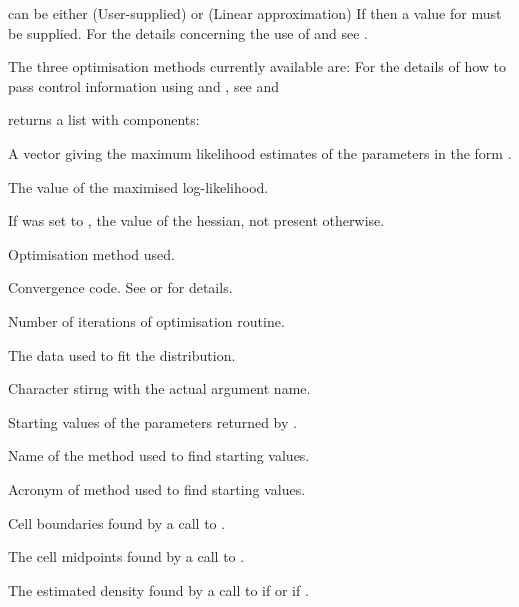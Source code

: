\documentclass{book}
\begin{document}
\begin{Details}\relax
{} can be either (User-supplied) or
 (Linear approximation)
If  then a value for  must be
supplied. For the details concerning the use of 
and  see .

The three optimisation methods currently available are:
For the details of how to pass control information using
 and , see  and
\end{Details}
\begin{Value}
 returns a list with components:
\begin{ldescription}
\item[\code{param}] A vector giving the maximum likelihood estimates of the
parameters in the form .
\item[\code{maxLik}] The value of the maximised log-likelihood.
\item[\code{hessian}] If  was set to , the value of
the hessian, not present otherwise.
\item[\code{method}] Optimisation method used.
\item[\code{conv}] Convergence code. See  or
 for details.
\item[\code{iter}] Number of iterations of optimisation routine.
\item[\code{x}] The data used to fit the distribution.
\item[\code{xName}] Character stirng with the actual  argument name.
\item[\code{paramStart}] Starting values of the parameters returned by
.
\item[\code{svName}] Name of the method used to find starting values.
\item[\code{startValues}] Acronym of method used to find starting values.
\item[\code{breaks}] Cell boundaries found by a call to .
\item[\code{midpoints}] The cell midpoints found by a call to
.
\item[\code{empDens}] The estimated density found by a call to
 if  or
 if .
\end{ldescription}
\end{Value}
\end{document}
